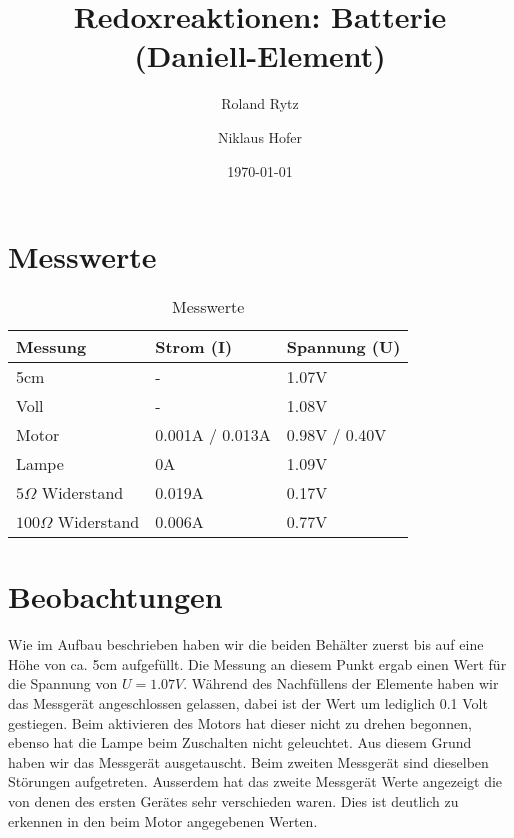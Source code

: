 \documentclass[11pt,paper=a4,final]{scrartcl}
\title{Redoxreaktionen: Batterie (Daniell-Element)}
\author{Roland Rytz \and Niklaus Hofer}
\date{\today{}}
\begin{document}
\maketitle
\newpage
\tableofcontents
\section{Messwerte}
\begin{table}[h!]
  \centering
  \begin{tabular}{|l|l|l|}\hline
    \bf Messung		& \bf Strom (I)	& \bf Spannung (U)	\\
    \hline
    5cm			& -		& 1.07V	\\
    \hline
    Voll		& -		& 1.08V \\
    \hline
    Motor		& 0.001A / 0.013A	& 0.98V / 0.40V \\
    \hline
    Lampe		& 0A		& 1.09V \\
    \hline
    \(5 \Omega\) Widerstand & 0.019A	& 0.17V \\
    \hline
    \(100 \Omega\) Widerstand & 0.006A	& 0.77V \\
    \hline
  \end{tabular}
  \caption{Messwerte}
  \label{tab:}
\end{table}
\section{Beobachtungen}
Wie im Aufbau beschrieben haben wir die beiden Beh\"alter zuerst bis auf eine
H\"ohe von ca. 5cm aufgef\"ullt. Die Messung an diesem Punkt ergab einen Wert
f\"ur die Spannung von \(U = 1.07V\). W\"ahrend des Nachf\"ullens der Elemente
haben wir das Messger\"at angeschlossen gelassen, dabei ist der Wert um
lediglich 0.1 Volt gestiegen. Beim aktivieren des Motors hat dieser nicht zu
drehen begonnen, ebenso hat die Lampe beim Zuschalten nicht geleuchtet. Aus
diesem Grund haben wir das Messger\"at ausgetauscht. Beim zweiten Messger\"at
sind dieselben St\"orungen aufgetreten. Ausserdem hat das zweite Messger\"at
Werte angezeigt die von denen des ersten Ger\"ates sehr verschieden waren. Dies
ist deutlich zu erkennen in den beim Motor angegebenen Werten.
\end{document}
